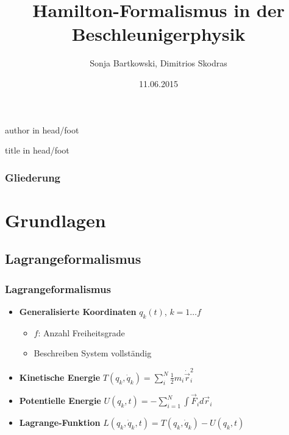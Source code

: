 \documentclass[hyperref={pdfpagelabels=false}]{beamer}
\title{Hamilton-Formalismus in der Beschleunigerphysik}
\institute{
Technische Universit\"at Dortmund}
\author{Sonja Bartkowski, Dimitrios Skodras}
\date{11.06.2015}
\begin{document}
{%
  \leavevmode%
 \begin{beamercolorbox}%
    [wd=.5\paperwidth,ht=2.5ex,dp=1.125ex,leftskip=.3cm,rightskip=.3cm]%
    {author in head/foot}%
    \hfill\insertshortauthor
  \end{beamercolorbox}%
  \begin{beamercolorbox}%
    [wd=.5\paperwidth,ht=2.5ex,dp=1.125ex,leftskip=.3cm ,rightskip=.3cm]%
    {title in head/foot}%
    \insertshorttitle\hfill\insertframenumber{}
  \end{beamercolorbox}%
}%

\captionsetup[figure]{font=small,skip=0pt}
\begin{frame}
\titlepage
\end{frame} 

\begin{frame}
\frametitle{Gliederung}
\tableofcontents
\end{frame} 


\section{Grundlagen}
\subsection{Lagrangeformalismus}

\begin{frame} 
\frametitle{Lagrangeformalismus}
\begin{itemize}
\item \textbf{Generalisierte Koordinaten} $q_k(t)$, $k = 1\dots f$\begin{itemize}
\item $f$: Anzahl Freiheitsgrade
\item Beschreiben System vollständig
\end{itemize}
\item \textbf{Kinetische Energie} $T(q_k,\dot{q}_k) = \sum\limits_i^N \frac{1}{2}m_i \dot{\vec{r}}_i^2$
\item \textbf{Potentielle Energie} $U(q_k,t) = - \sum\limits_{i=1}^N \int \vec{F}_i d\vec{r}_i$
\item \textbf{Lagrange-Funktion}
$L(q_k,\dot{q}_k,t) = T(q_k,\dot{q}_k) - U(q_k,t)$
\end{itemize}

\end{frame}
\end{document}
